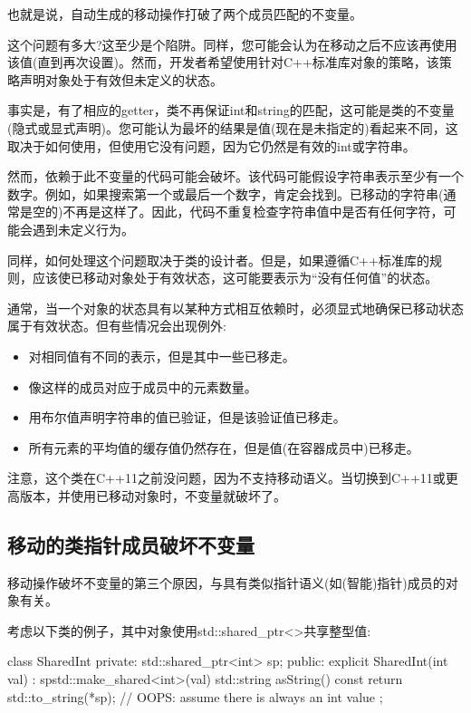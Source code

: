 也就是说，自动生成的移动操作打破了两个成员匹配的不变量。

这个问题有多大?这至少是个陷阱。同样，您可能会认为在移动之后不应该再使用该值(直到再次设置)。然而，开发者希望使用针对C++标准库对象的策略，该策略声明对象处于有效但未定义的状态。

事实是，有了相应的getter，类不再保证int和string的匹配，这可能是类的不变量(隐式或显式声明)。您可能认为最坏的结果是值(现在是未指定的)看起来不同，这取决于如何使用，但使用它没有问题，因为它仍然是有效的int或字符串。

然而，依赖于此不变量的代码可能会破坏。该代码可能假设字符串表示至少有一个数字。例如，如果搜索第一个或最后一个数字，肯定会找到。已移动的字符串(通常是空的)不再是这样了。因此，代码不重复检查字符串值中是否有任何字符，可能会遇到未定义行为。

同样，如何处理这个问题取决于类的设计者。但是，如果遵循C++标准库的规则，应该使已移动对象处于有效状态，这可能要表示为“没有任何值”的状态。

通常，当一个对象的状态具有以某种方式相互依赖时，必须显式地确保已移动状态属于有效状态。但有些情况会出现例外:

\begin{itemize}
	\item 对相同值有不同的表示，但是其中一些已移走。
	\item 像这样的成员对应于成员中的元素数量。
	\item 用布尔值声明字符串的值已验证，但是该验证值已移走。
	\item 所有元素的平均值的缓存值仍然存在，但是值(在容器成员中)已移走。
\end{itemize}

注意，这个类在C++11之前没问题，因为不支持移动语义。当切换到C++11或更高版本，并使用已移动对象时，不变量就破坏了。

\subsection{移动的类指针成员破坏不变量}

移动操作破坏不变量的第三个原因，与具有类似指针语义(如(智能)指针)成员的对象有关。

考虑以下类的例子，其中对象使用std::shared_ptr<>共享整型值:

\begin{cppcode}
class SharedInt {
private:
	std::shared_ptr<int> sp;
public:
	explicit SharedInt(int val)
	: sp{std::make_shared<int>(val)} {
	}
	std::string asString() const {
		return std::to_string(*sp); // OOPS: assume there is always an int value
	}
};
\end{cppcode}

